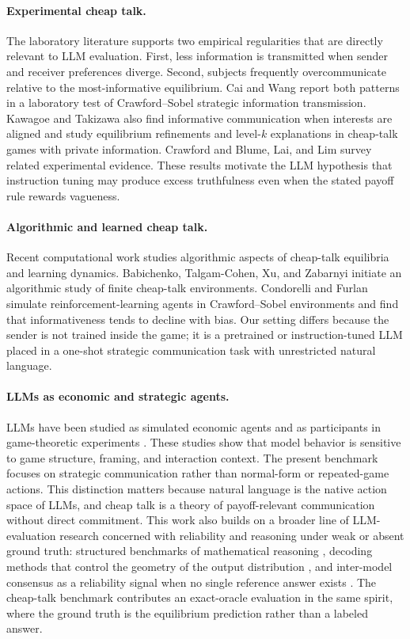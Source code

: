 \documentclass[11pt]{article}
\begin{document}
\paragraph{Experimental cheap talk.}
The laboratory literature supports two empirical regularities that are directly relevant to LLM evaluation.  First, less information is transmitted when sender and receiver preferences diverge.  Second, subjects frequently overcommunicate relative to the most-informative equilibrium.  Cai and Wang \cite{cai2006} report both patterns in a laboratory test of Crawford--Sobel strategic information transmission.  Kawagoe and Takizawa \cite{kawagoe2009} also find informative communication when interests are aligned and study equilibrium refinements and level-$k$ explanations in cheap-talk games with private information.  Crawford \cite{crawford1998} and Blume, Lai, and Lim \cite{blume2020} survey related experimental evidence.  These results motivate the LLM hypothesis that instruction tuning may produce excess truthfulness even when the stated payoff rule rewards vagueness.

\paragraph{Algorithmic and learned cheap talk.}
Recent computational work studies algorithmic aspects of cheap-talk equilibria and learning dynamics.  Babichenko, Talgam-Cohen, Xu, and Zabarnyi \cite{babichenko2024} initiate an algorithmic study of finite cheap-talk environments.  Condorelli and Furlan \cite{condorelli2024} simulate reinforcement-learning agents in Crawford--Sobel environments and find that informativeness tends to decline with bias.  Our setting differs because the sender is not trained inside the game; it is a pretrained or instruction-tuned LLM placed in a one-shot strategic communication task with unrestricted natural language.

\paragraph{LLMs as economic and strategic agents.}
LLMs have been studied as simulated economic agents and as participants in game-theoretic experiments \cite{horton2023,fan2024,lore2024,akata2025}.  These studies show that model behavior is sensitive to game structure, framing, and interaction context.  The present benchmark focuses on strategic communication rather than normal-form or repeated-game actions.  This distinction matters because natural language is the native action space of LLMs, and cheap talk is a theory of payoff-relevant communication without direct commitment.  This work also builds on a broader line of LLM-evaluation research concerned with reliability and reasoning under weak or absent ground truth: structured benchmarks of mathematical reasoning \cite{davoodi2025matt}, decoding methods that control the geometry of the output distribution \cite{davoodi2026geometry}, and inter-model consensus as a reliability signal when no single reference answer exists \cite{amiri2025consensus,mousavi2025collective}.  The cheap-talk benchmark contributes an exact-oracle evaluation in the same spirit, where the ground truth is the equilibrium prediction rather than a labeled answer.
\end{document}
